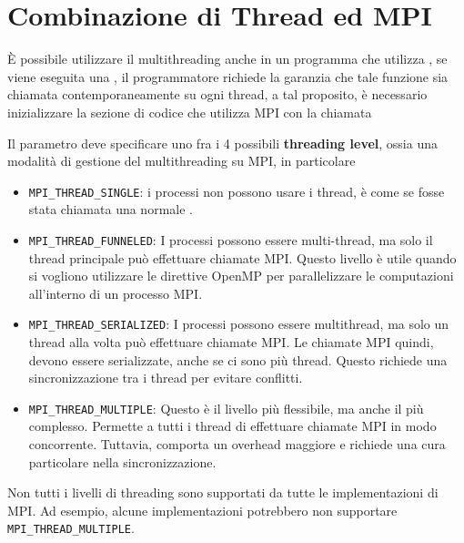 \documentclass[10pt, letterpaper]{report}
\begin{document}
\section{Combinazione di Thread ed MPI}
È possibile utilizzare il multithreading anche in un programma che utilizza , se viene eseguita una , il programmatore richiede la garanzia che tale funzione sia chiamata contemporaneamente su ogni thread, a tal proposito, è necessario inizializzare la sezione di codice che utilizza MPI con la chiamata \begin{center}
\end{center}
Il parametro  deve specificare uno fra i 4 possibili \textbf{threading level}, ossia una modalità di gestione del multithreading su MPI, in particolare\begin{itemize}
    \item \texttt{MPI\_THREAD\_SINGLE}: i processi  non possono usare i thread, è come se fosse stata chiamata una normale .
    \item \texttt{MPI\_THREAD\_FUNNELED}: I processi possono essere multi-thread, ma solo il thread principale può effettuare chiamate MPI. Questo livello è utile quando si vogliono utilizzare le direttive OpenMP per parallelizzare le computazioni all'interno di un processo MPI.
    \item \texttt{MPI\_THREAD\_SERIALIZED}: I processi possono essere multithread, ma solo un thread alla volta può effettuare chiamate MPI.  Le chiamate MPI quindi, devono essere serializzate, anche se ci sono più thread. Questo richiede una sincronizzazione tra i thread per evitare conflitti.
    \item \texttt{MPI\_THREAD\_MULTIPLE}: Questo è il livello più flessibile, ma anche il più complesso. Permette a tutti i thread di effettuare chiamate MPI in modo concorrente. Tuttavia, comporta un overhead maggiore e richiede una cura particolare nella sincronizzazione.
\end{itemize}
Non tutti i livelli di threading sono supportati da tutte le implementazioni di MPI. Ad esempio, alcune implementazioni potrebbero non supportare \texttt{MPI\_THREAD\_MULTIPLE}.
\end{document}
